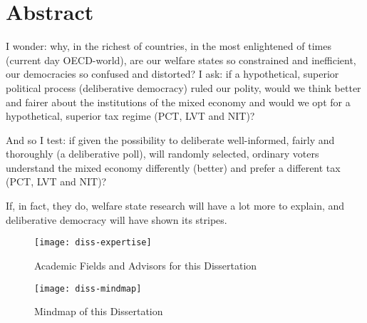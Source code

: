 \chapter*{Abstract}


I wonder: why, in the richest of countries, in the most enlightened of times (current day \gls{OECD}-world), are our welfare states so constrained and inefficient, our democracies so confused and distorted? 
I ask: if a hypothetical, superior political process (deliberative democracy) ruled our polity, would we think better and fairer about the institutions of the mixed economy and would we opt for a hypothetical, superior tax regime (\gls{PCT}, \gls{LVT} and \gls{NIT})? 

And so I test: if given the possibility to deliberate well-informed, fairly and thoroughly (a deliberative poll), will randomly selected, ordinary voters understand the mixed economy differently (better) and prefer a different tax (\gls{PCT}, \gls{LVT} and \gls{NIT})? %
		
			
If, in fact, they do, welfare state research will have a lot more to explain, and deliberative democracy will have shown its stripes.

\begin{figure}[htbp]
	\centering
	\texttt{[image: diss-expertise]}  
	\caption{Academic Fields and Advisors for this Dissertation}
	\label{fig:diss-expertise}
\end{figure}

\begin{landscape}
\begin{figure}[htbp]
	\centering
	\texttt{[image: diss-mindmap]}  
	\caption{Mindmap of this Dissertation}
	\label{fig:diss-mindmap}
\end{figure} 
\end{landscape}